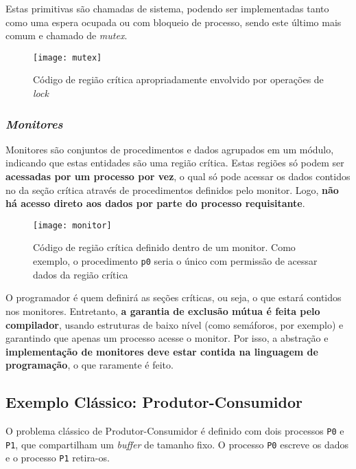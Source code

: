 Estas primitivas são chamadas de sistema, podendo ser implementadas tanto como uma espera ocupada ou com bloqueio de processo, sendo este último mais comum e chamado de \textit{mutex}.

\begin{figure}[ht]
  \centering
  \texttt{[image: mutex]}
  \caption{Código de região crítica apropriadamente envolvido por operações de \textit{lock}}
  \label{fig:mutex}
\end{figure}


\subsubsection{\textit{Monitores}}
Monitores são conjuntos de procedimentos e dados agrupados em um módulo, indicando que estas entidades são uma região crítica. Estas regiões só podem ser \textbf{acessadas por um processo por vez}, o qual só pode acessar os dados contidos no da seção crítica através de procedimentos definidos pelo monitor. Logo, \textbf{não há acesso direto aos dados por parte do processo requisitante}.

\begin{figure}[ht]
  \centering
  \texttt{[image: monitor]}
  \caption{Código de região crítica definido dentro de um monitor. Como exemplo, o procedimento \texttt{p0} seria o único com permissão de acessar dados da região crítica}
  \label{fig:monitor}
\end{figure}

O programador é quem definirá as seções críticas, ou seja, o que estará contidos nos monitores. Entretanto, \textbf{a garantia de exclusão mútua é feita pelo compilador}, usando estruturas de baixo nível (como semáforos, por exemplo) e garantindo que apenas um processo acesse o monitor. Por isso, a abstração e \textbf{implementação de monitores deve estar contida na linguagem de programação}, o que raramente é feito.








\subsection{Exemplo Clássico: Produtor-Consumidor}
O problema clássico de Produtor-Consumidor é definido com dois processos \texttt{P0} e \texttt{P1}, que compartilham um \textit{buffer} de tamanho fixo. O processo \texttt{P0} escreve os dados e o processo \texttt{P1} retira-os.

